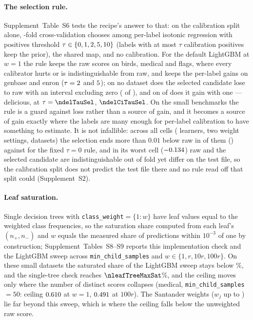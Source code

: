 \documentclass[sigconf,nonacm]{acmart}
\newcommand{\Supp}[1]{Supplement~#1}  %
\begin{document}
\paragraph{The selection rule.} \Supp{Table~S6} tests the recipe's answer to that: on the calibration split alone, \ntauFolds-fold cross-validation chooses among per-label isotonic regression with positives threshold $\tau\in\{0, 1, 2, 5, 10\}$ (labels with at most $\tau$ calibration positives keep the prior), the shared map, and no calibration. For the default LightGBM at $w{=}1$ the rule keeps the raw scores on birds, medical and flags, where every calibrator hurts or is indistinguishable from raw, and keeps the per-label gains on genbase and enron ($\tau=2$ and $5$); on no dataset does the selected candidate lose to raw with an interval excluding zero (\nnHurtAfterTau{} of \nnMulan), and on \nnTauSigGain{} of \nnMulan{} does it gain with one --- delicious, at $\tau=\ndelTauSel$, $\ndelCiTauSel$. On the small benchmarks the rule is a guard against loss rather than a source of gain, and it becomes a source of gain exactly where the labels are many enough for per-label calibration to have something to estimate. It is not infallible: across all \nnTauCells{} cells (\nnLearners{} learners, two weight settings, \nnMulan{} datasets) the selection ends more than $0.01$ below raw in \nnTauSelBelowRaw{} of them (\ntauFailCells) against \nnTauZeroBelowRaw{} for the fixed $\tau=0$ rule, and in its worst cell ($-0.134$) raw and the selected candidate are indistinguishable out of fold yet differ on the test file, so the calibration split does not predict the test file there and no rule read off that split could (\Supp{S2}).

\paragraph{Leaf saturation.} Single decision trees with \texttt{class\_weight}$=\{1{:}w\}$ have leaf values equal to the weighted class frequencies, so the saturation share computed from each leaf's $(n_+,n_-)$ and $w$ equals the measured share of predictions within $10^{-3}$ of one by construction; \Supp{Tables~S8--S9} reports this implementation check and the LightGBM sweep across \texttt{min\_child\_samples} and $w\in\{1,r,10r,100r\}$. On these small datasets the saturated share of the LightGBM sweep stays below \nleafLgbmMaxSat\%, and the single-tree check reaches $\nleafTreeMaxSat$\%, and the ceiling moves only where the number of distinct scores collapses (medical, \texttt{min\_child\_samples}$=50$: ceiling $0.610$ at $w{=}1$, $0.491$ at $100r$). The Santander weights ($w_j$ up to \nwMax) lie far beyond this sweep, which is where the ceiling falls below the unweighted raw score.
\end{document}
